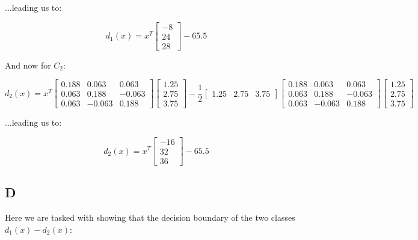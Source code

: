 \documentclass{article}
\begin{document}
\noindent ...leading us to:

\begin{equation}
    d_1(x)=x^T \begin{bmatrix}-8 \\ 24 \\ 28\end{bmatrix} - 65.5
\end{equation}

\noindent And now for $C_2$:

\begin{equation}
    d_2(x) = x^T \begin{bmatrix}
        0.188 & 0.063 & 0.063 \\
        0.063 & 0.188 & -0.063 \\
        0.063 & -0.063 & 0.188
    \end{bmatrix} \begin{bmatrix}
        1.25 \\ 2.75 \\ 3.75
    \end{bmatrix} -
    \frac{1}{2} \begin{bmatrix}
        1.25 & 2.75 & 3.75
    \end{bmatrix}
    \begin{bmatrix}
        0.188 & 0.063 & 0.063 \\
        0.063 & 0.188 & -0.063 \\
        0.063 & -0.063 & 0.188
    \end{bmatrix} \begin{bmatrix}
        1.25 \\ 2.75 \\ 3.75
    \end{bmatrix}
\end{equation}

\noindent ...leading us to:

\begin{equation}
    d_2(x)=x^T \begin{bmatrix}-16 \\ 32 \\ 36\end{bmatrix} - 65.5
\end{equation}


\subsection*{D}

Here we are tasked with showing that the decision boundary of the two classes $d_1(x)-d_2(x)$:
\end{document}
